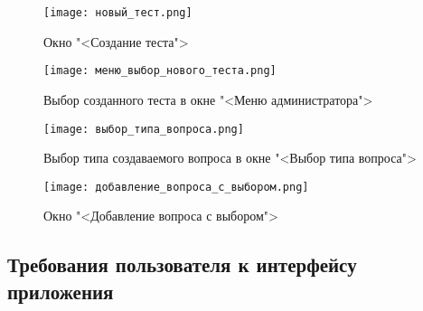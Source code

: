 \begin{figure}[ht]
	\centering
	\texttt{[image: новый\_тест.png]}
	\caption{Окно "<Создание теста">}
	\label{new_test_window:image}
\end{figure}
\begin{figure}[ht]
	\centering
	\texttt{[image: меню\_выбор\_нового\_теста.png]}
	\caption{Выбор созданного теста в окне "<Меню администратора">}
	\label{menu_new_test_window:image}
\end{figure}
\begin{figure}[H]
	\centering
	\texttt{[image: выбор\_типа\_вопроса.png]}
	\caption{Выбор типа создаваемого вопроса в окне "<Выбор типа вопроса">}
	\label{question_selection:image}
\end{figure}
\begin{figure}[H]
	\centering
	\texttt{[image: добавление\_вопроса\_с\_выбором.png]}
	\caption{Окно "<Добавление вопроса с выбором">}
	\label{radio_question:image}
\end{figure}

\subsection{Требования пользователя к интерфейсу приложения}

